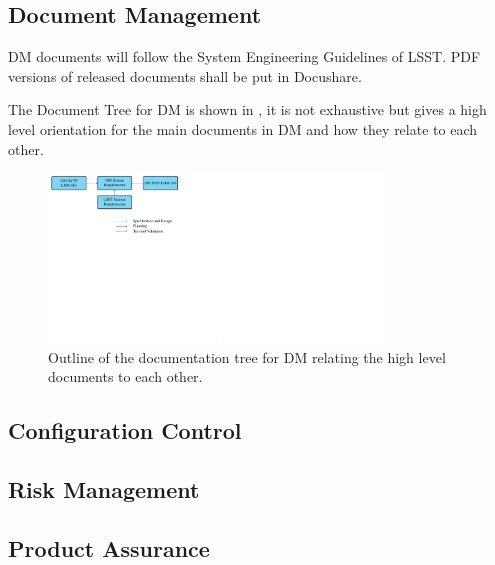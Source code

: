 \subsection {Document Management}
DM documents will follow the System Engineering Guidelines of LSST. PDF versions of released documents shall be put in Docushare. 

The Document Tree for DM is shown in , it is not exhaustive but gives a high level orientation for the main documents in DM and how they relate to each other.

\begin{figure}
\begin{center}
 \includegraphics[width=0.8\textwidth]{images/DocTree}
\caption{Outline of the documentation tree for DM relating the high level documents to each other. \label{fig:doctree}}
\end{center}
\end{figure}

\subsection {Configuration Control }
\subsection {Risk Management }
\subsection {Product Assurance  }
